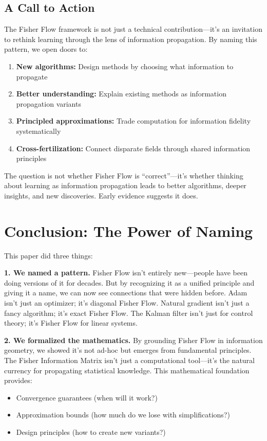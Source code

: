 \documentclass[11pt]{article}
\begin{document}
\subsection{A Call to Action}

The Fisher Flow framework is not just a technical contribution—it's an invitation to rethink learning through the lens of information propagation. By naming this pattern, we open doors to:

\begin{enumerate}
\item \textbf{New algorithms:} Design methods by choosing what information to propagate
\item \textbf{Better understanding:} Explain existing methods as information propagation variants
\item \textbf{Principled approximations:} Trade computation for information fidelity systematically
\item \textbf{Cross-fertilization:} Connect disparate fields through shared information principles
\end{enumerate}

The question is not whether Fisher Flow is ``correct''—it's whether thinking about learning as information propagation leads to better algorithms, deeper insights, and new discoveries. Early evidence suggests it does.

\section{Conclusion: The Power of Naming}

This paper did three things:

\textbf{1. We named a pattern.} Fisher Flow isn't entirely new—people have been doing versions of it for decades. But by recognizing it as a unified principle and giving it a name, we can now see connections that were hidden before. Adam isn't just an optimizer; it's diagonal Fisher Flow. Natural gradient isn't just a fancy algorithm; it's exact Fisher Flow. The Kalman filter isn't just for control theory; it's Fisher Flow for linear systems.

\textbf{2. We formalized the mathematics.} By grounding Fisher Flow in information geometry, we showed it's not ad-hoc but emerges from fundamental principles. The Fisher Information Matrix isn't just a computational tool—it's the natural currency for propagating statistical knowledge. This mathematical foundation provides:
\begin{itemize}
\item Convergence guarantees (when will it work?)
\item Approximation bounds (how much do we lose with simplifications?)
\item Design principles (how to create new variants?)
\end{itemize}
\end{document}

